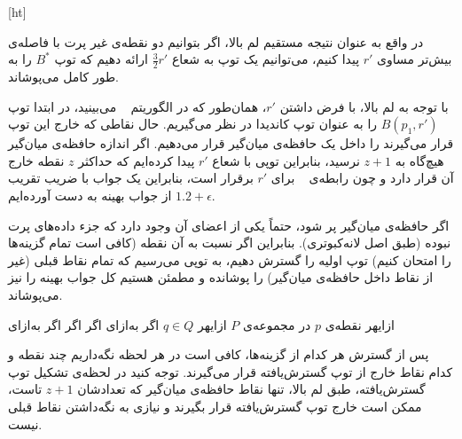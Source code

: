 


[ht]


در واقع به عنوان نتیجه مستقیم لم بالا، اگر بتوانیم دو نقطه‌ی غیر پرت با فاصله‌ی بیش‌تر مساوی $r'$ پیدا کنیم، می‌توانیم یک توپ به شعاع $\frac{3}{2}r'$ ارائه دهیم که توپ $B^*$ را به طور کامل می‌پوشاند.

با توجه به لم بالا، با فرض داشتن $r'$، همان‌طور که در الگوریتم ~ می‌بینید، در ابتدا توپ $B(p_1, r')$ را به عنوان توپ کاندیدا در نظر می‌گیریم.
حال نقاطی که خارج این توپ قرار می‌گیرند را داخل یک حافظه‌ی میان‌گیر قرار می‌دهیم.
اگر اندازه حافظه‌ی میان‌گیر هیچ‌گاه به $z+1$ نرسید، بنابراین توپی با شعاع $r'$ پیدا کرده‌ایم که حداکثر $z$ نقطه خارج آن قرار دارد و چون رابطه‌ی ~ برای $r'$ برقرار است، بنابراین یک جواب با ضریب تقریب $1.2 + \epsilon$ از جواب بهینه به دست آورده‌ایم.

اگر حافظه‌ی میان‌گیر پر شود، حتماً یکی از اعضای آن وجود دارد که جزء داده‌های پرت نبوده (طبق اصل لانه‌کبوتری).
بنابراین اگر نسبت به آن نقطه (کافی است تمام گزینه‌ها را امتحان کنیم) توپ اولیه را گسترش دهیم، به توپی می‌رسیم که تمام نقاط قبلی (غیر از نقاط داخل حافظه‌ی میان‌گیر) را پوشانده و مطمئن هستیم کل جواب بهینه را نیز می‌پوشاند. 

‌ازای{هر نقطه‌ی $p$ در مجموعه‌ی $P$}
‌ازای{هر $q \in Q$}
‌اگر{}
‌به‌ازای{}
‌اگر
‌اگر{}
‌اگر{}
‌به‌ازای{}


پس از گسترش هر کدام از گزینه‌ها، کافی است در هر لحظه نگه‌داریم چند نقطه و کدام نقاط خارج از توپ گسترش‌یافته قرار می‌گیرند.
توجه کنید در لحظه‌ی تشکیل توپ گسترش‌یافته، طبق لم بالا، تنها نقاط حافظه‌ی میان‌گیر که تعدادشان $z+1$ تاست، ممکن است خارج توپ گسترش‌یافته قرار بگیرند و نیازی به نگه‌داشتن نقاط قبلی نیست.


